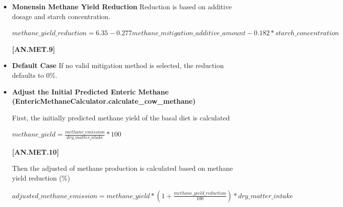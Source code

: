 \begin{refsection}
\begin{itemize}
            {\raggedleft \textbf{[AN.MET.8]}\par}
            \vspace{0.5cm}
            
        \item \textbf{Monensin Methane Yield Reduction}
Reduction is based on additive dosage and starch concentration.
\vspace{0.2cm}

    \begin{center}
        \(methane\_yield\_reduction = 6.35 - 0.277 methane\_mitigation\_additive\_amount 
	-0.182 * starch\_concentration\)
    \end{center}
        \vspace{0.5cm} 
    
            {\raggedleft \textbf{[AN.MET.9]}\par}
            \vspace{0.5cm}

        \item \textbf{Default Case} If no valid mitigation method is selected, the reduction defaults to 0\%.
        
        \item \textbf{Adjust the Initial Predicted Enteric Methane (EntericMethaneCalculator.calculate\_cow\_methane)}
        
First, the initially predicted methane yield of the basal diet is calculated 
\vspace{0.2cm}

    \begin{center}
        \(methane\_yield = \frac{methane\_emission}{dry\_matter_intake}*100\)
    \end{center}
        \vspace{0.5cm} 
    
            {\raggedleft \textbf{[AN.MET.10]}\par}
            \vspace{0.5cm}

Then the adjusted of methane production is calculated based on methane yield reduction (\%) 
\vspace{0.2cm}

    \begin{center}
        \(adjusted\_methane\_emission = methane\_yield * (1 + \frac{methane\_yield\_reduction}{100}) * dry\_matter\_intake\)
    \end{center}
        \vspace{0.5cm} 
    

\end{itemize}
\end{refsection}

